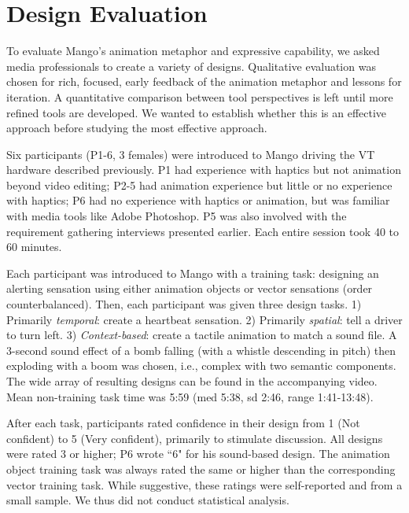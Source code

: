 %
%
\section{Design Evaluation}
To evaluate Mango's %
animation metaphor and expressive capability,
we asked media professionals to
create a variety of designs.
Qualitative evaluation was chosen for rich, focused, early feedback of the animation metaphor and lessons for iteration.
A quantitative comparison between tool perspectives is left until more refined tools are developed.
We wanted to establish whether this is an effective approach before studying the most effective approach.


Six participants (P1-6, 3 females) were introduced to Mango driving %
the  VT hardware described previously. %
P1 had experience with haptics but not animation beyond video editing;
P2-5 had animation experience but little or no experience with haptics;
P6 had no experience with haptics or animation, but was familiar with media tools like Adobe Photoshop.
P5 was also involved with the requirement gathering interviews presented earlier.
Each entire session took 40 to 60 minutes.


Each participant was introduced to Mango with a training task: %
designing an alerting sensation using %
either animation objects or vector sensations (order counterbalanced).
Then, each participant was given three design tasks.
1) Primarily \emph{temporal}: create a heartbeat sensation.
2) Primarily \emph{spatial}: tell a driver to turn left.
3) \emph{Context-based}: create a tactile animation to match a sound file.
A 3-second sound effect of a bomb falling (with a whistle descending in pitch) then exploding with a boom was chosen, i.e., complex with two semantic components.
The wide array of resulting designs can be found in the accompanying video.
Mean non-training task time was 5:59 (med 5:38, sd 2:46, range 1:41-13:48).

After each task, participants rated confidence in their design from 1 (Not confident) to 5 (Very confident), primarily to stimulate discussion.
All designs were rated 3 or higher; P6 wrote ``6" for his sound-based design.
The animation object training task was always rated the same or higher than the corresponding vector training task.
While suggestive, these ratings were self-reported and from a small sample.
We thus did not conduct statistical analysis.

